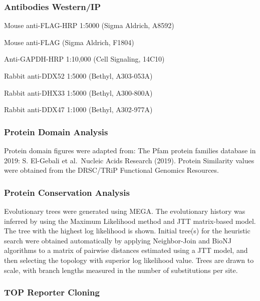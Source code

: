 \documentclass[12pt,oneside]{reedthesis}
\begin{document}
\hypertarget{antibodies-westernip}{%
\subsubsection{Antibodies Western/IP}\label{antibodies-westernip}}

Mouse anti-FLAG-HRP 1:5000 (Sigma Aldrich, A8592)

Mouse anti-FLAG (Sigma Aldrich, F1804)

Anti-GAPDH-HRP 1:10,000 (Cell Signaling, 14C10)

Rabbit anti-DDX52 1:5000 (Bethyl, A303-053A)

Rabbit anti-DHX33 1:5000 (Bethyl, A300-800A)

Rabbit anti-DDX47 1:1000 (Bethyl, A302-977A)

\hypertarget{protein-domain-analysis}{%
\subsubsection{Protein Domain Analysis}\label{protein-domain-analysis}}

Protein domain figures were adapted from: The Pfam protein families database in 2019: S. El-Gebali et al.~Nucleic Acids Research (2019). Protein Similarity values were obtained from the DRSC/TRiP Functional Genomics Resources.

\hypertarget{protein-conservation-analysis}{%
\subsubsection{Protein Conservation Analysis}\label{protein-conservation-analysis}}

Evolutionary trees were generated using MEGA. The evolutionary history was inferred by using the Maximum Likelihood method and JTT matrix-based model. The tree with the highest log likelihood is shown. Initial tree(s) for the heuristic search were obtained automatically by applying Neighbor-Join and BioNJ algorithms to a matrix of pairwise distances estimated using a JTT model, and then selecting the topology with superior log likelihood value. Trees are drawn to scale, with branch lengths measured in the number of substitutions per site.

\hypertarget{top-reporter-cloning}{%
\subsubsection{TOP Reporter Cloning}\label{top-reporter-cloning}}
\end{document}

